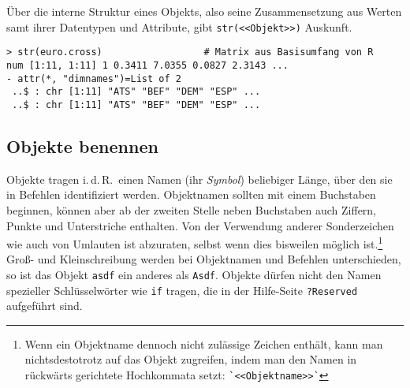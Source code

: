 Über die interne Struktur eines Objekts, also seine Zusammensetzung aus Werten samt ihrer Datentypen und Attribute, gibt \lstinline!str(<<Objekt>>)! Auskunft.
\begin{lstlisting}
> str(euro.cross)                  # Matrix aus Basisumfang von R
num [1:11, 1:11] 1 0.3411 7.0355 0.0827 2.3143 ...
- attr(*, "dimnames")=List of 2
 ..$ : chr [1:11] "ATS" "BEF" "DEM" "ESP" ...
 ..$ : chr [1:11] "ATS" "BEF" "DEM" "ESP" ...
\end{lstlisting}

\subsection{Objekte benennen}
\label{sec:objectNames}

Objekte tragen i.\,d.\,R.\ einen Namen (ihr \emph{Symbol}) beliebiger Länge, über den sie in Befehlen identifiziert werden. Objektnamen sollten mit einem Buchstaben beginnen, können aber ab der zweiten Stelle neben Buchstaben auch Ziffern, Punkte und Unterstriche enthalten. Von der Verwendung anderer Sonderzeichen wie auch von Umlauten ist abzuraten, selbst wenn dies bisweilen möglich ist.\footnote{Wenn ein Objektname dennoch nicht zulässige Zeichen enthält, kann man nichtsdestotrotz auf das Objekt zugreifen, indem man den Namen in rückwärts gerichtete Hochkommata setzt: \lstinline!`<<Objektname>>`!} Groß- und Kleinschreibung werden bei Objektnamen und Befehlen unterschieden, so ist das Objekt \lstinline!asdf! ein anderes als \lstinline!Asdf!. Objekte dürfen nicht den Namen spezieller Schlüsselwörter wie \lstinline!if! tragen, die in der Hilfe-Seite \lstinline!?Reserved! aufgeführt sind.

